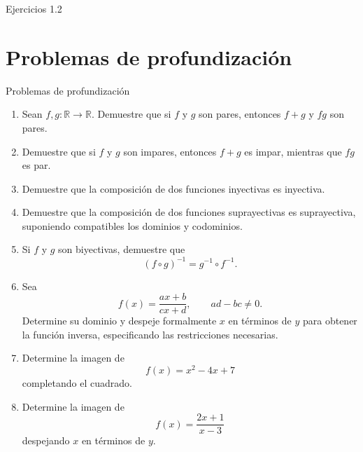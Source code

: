\documentclass[aspectratio=169,10pt]{beamer}
\newcommand{\R}{\mathbb{R}}
\begin{document}
\begin{frame}{Ejercicios 1.2}
\end{frame}
\section{Problemas de profundización}
\begin{frame}{Problemas de profundización}
\begin{enumerate}
    \item Sean $f,g:\R\to\R$. Demuestre que si $f$ y $g$ son pares, entonces
    $f+g$ y $fg$ son pares.

    \item Demuestre que si $f$ y $g$ son impares, entonces $f+g$ es impar,
    mientras que $fg$ es par.

    \item Demuestre que la composición de dos funciones inyectivas es
    inyectiva.

    \item Demuestre que la composición de dos funciones suprayectivas es
    suprayectiva, suponiendo compatibles los dominios y codominios.

    \item Si $f$ y $g$ son biyectivas, demuestre que
    \[
    (f\circ g)^{-1}=g^{-1}\circ f^{-1}.
    \]

    \item Sea
    \[
    f(x)=\frac{ax+b}{cx+d},
    \qquad ad-bc\neq0.
    \]
    Determine su dominio y despeje formalmente $x$ en términos de $y$ para
    obtener la función inversa, especificando las restricciones necesarias.

    \item Determine la imagen de
    \[
    f(x)=x^2-4x+7
    \]
    completando el cuadrado.

    \item Determine la imagen de
    \[
    f(x)=\frac{2x+1}{x-3}
    \]
    despejando $x$ en términos de $y$.
\end{enumerate}

\end{frame}
\end{document}
